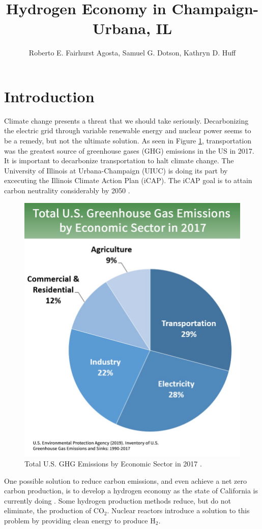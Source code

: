 \documentclass{anstrans}
\title{Hydrogen Economy in Champaign-Urbana, IL}
\author{Roberto E. Fairhurst Agosta, Samuel G. Dotson, Kathryn D. Huff}
\institute{
University of Illinois at Urbana-Champaign, Dept. of Nuclear, Plasma, and Radiological Engineering\\
ref3@illinois.edu
}
\begin{document}
\section{Introduction}

Climate change presents a threat that we should take seriously. Decarbonizing the electric grid through variable renewable energy and nuclear power seems to be a remedy, but not the ultimate solution. As seen in Figure \ref{fig:ghg}, transportation was the greatest source of greenhouse gases (GHG) emissions in the US in 2017. It is important to decarbonize transportation to halt climate change. The University of Illinois at Urbana-Champaign (UIUC) is doing its part by excecuting the Illinois Climate Action Plan (iCAP). The iCAP goal is to attain carbon neutrality considerably by 2050 \cite{noauthor_illlinois_2015}.

\begin{figure}[H]
	\centering
	\includegraphics[width=0.6\linewidth]{figures/total-ghg-2019-caption.jpg}
	\hfill
	\caption{Total U.S. GHG Emissions by Economic Sector in 2017 \cite{us_epa_sources_2020}.}
	\label{fig:ghg}
\end{figure}

One possible solution to reduce carbon emissions, and even achieve a net zero carbon production, is to develop a hydrogen economy as the state of California is currently doing \cite{brown_economic_2013}. Some hydrogen production methods reduce, but do not eliminate, the production of CO$_2$. Nuclear reactors introduce a solution to this problem by providing clean energy to produce H$_2$.
\end{document}
